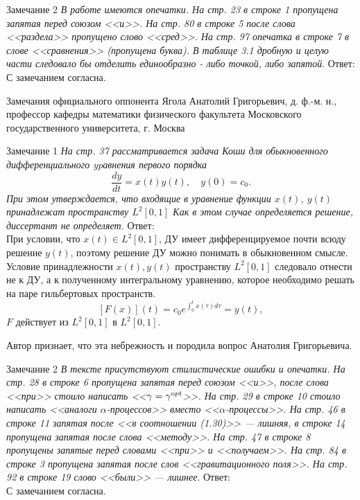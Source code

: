 \documentclass[10pt,pdf, mathserif, hyperref={unicode}]{beamer}
\begin{document}
\begin{frame}{Замечание 2}
	\textit{В работе имеются опечатки. На стр. 23 в строке 1 пропущена запятая перед союзом <<и>>. На стр. 80 в строке 5 после слова <<раздела>> пропущено слово <<сред>>. На стр. 97 опечатка в строке 7 в слове <<сравнения>> (пропущена буква). В таблице 3.1 дробную и целую части следовало бы отделить единообразно - либо точкой, либо запятой}.
	\vskip 5mm
	Ответ:\\
	С замечанием согласна.
\end{frame}

\begin{frame}{Замечания официального оппонента}
	Ягола Анатолий Григорьевич, д. ф.-м. н., профессор кафедры математики физического факультета Московского государственного университета, г. Москва
	
\end{frame}

\begin{frame}{Замечание 1}
	\scriptsize
	\textit{На стр. 37 рассматривается задача Коши для обыкновенного дифференциального ypавнения первого порядка $$	\frac{dy}{dt}=x(t)y(t), \quad y(0)=c_0.$$ При этом утверждается, что входящие в уравнение функции $x(t)$, $y(t)$ принадлежат пространству $L^2[0,1]$ Как в этом случае определяется решение, диссертант не определяет.}
	\vskip 5mm
	Ответ:\\
	При условии, что $x(t)\in L^2[0,1]$, ДУ имеет дифференцируемое почти всюду решение $y(t)$, поэтому решение ДУ можно понимать в обыкновенном смысле. Условие  принадлежности $x(t), y(t)$ пространству $L^2[0,1]$ следовало отнести не к ДУ, а к полученному интегральному уравнению, которое необходимо решать на паре гильбертовых пространств.
	$$[F(x)](t)=c_0 e^{\int_{0}^{t}x(\tau)d\tau}=y(t),$$
	$F$ действует из $L^2[0,1]$ в $L^2[0,1]$.
	
	Автор признает, что эта небрежность и породила вопрос Анатолия Григорьевича.
\end{frame}

\begin{frame}{Замечание 2}
	\textit{В тексте присутствуют стилистические ошибки и опечатки. На стр. 28 в строке 6 пропущена запятая перед союзом <<и>>, после слова <<при>> стоило написать <<$\gamma=\gamma^{\textnormal opt}$>>. На стр. 29 в строке 10 стоило написать  <<аналоги $\alpha$-процессов>> вместо <<$\alpha$-процессы>>. На стр. 46 в строке 11 запятая после <<в соотношении (1.30)>> --- лишняя, в строке 14 пропущена запятая после слова <<методу>>. На стр. 47 в строке 8 пропущены запятые перед словами <<при>> и <<получаем>>. На стр. 84 в строке 3 пропущена запятая после слов <<гравитационного поля>>. На стр. 92 в строке 19 слово <<были>> --- лишнее}.
	\vskip 5mm
	Ответ:\\
	С замечанием согласна.
\end{frame}
\end{document}
